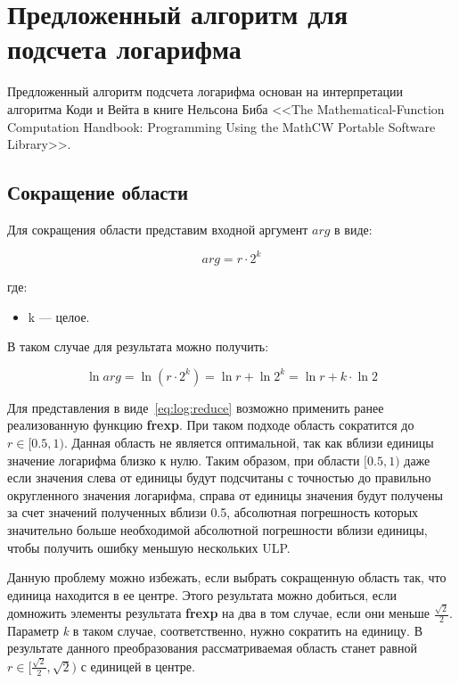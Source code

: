 \chapter{Предложенный алгоритм для подсчета логарифма}

Предложенный алгоритм подсчета логарифма основан на интерпретации алгоритма Коди и Вейта в книге Нельсона Биба <<The Mathematical-Function Computation Handbook: Programming Using the MathCW Portable Software Library>>\cite{beebe}.

\section{Сокращение области}

Для сокращения области представим входной аргумент $arg$ в виде:

\begin{equation}
    arg = r \cdot 2^k
    \label{eq:log:reduce}
\end{equation}

где:

\begin{itemize}
    \item[] k --- целое.
\end{itemize}

В таком случае для результата можно получить:

\begin{equation}
    \ln{arg} = \ln{(r \cdot 2^k)} = \ln{r} + \ln{2^k} = \ln{r} + k \cdot \ln{2}
    \label{eq:log:reconstr}
\end{equation}

Для представления в виде~\ref{eq:log:reduce} возможно применить ранее реализованную функцию \textbf{frexp}.
При таком подходе область сократится до $r \in [0.5, 1)$.
Данная область не является оптимальной, так как вблизи единицы значение логарифма близко к нулю.
Таким образом, при области $[0.5, 1)$ даже если значения слева от единицы будут подсчитаны с точностью до правильно округленного значения логарифма, справа от единицы значения будут получены за счет значений полученных вблизи 0.5, абсолютная погрешность которых значительно больше необходимой абсолютной погрешности вблизи единицы, чтобы получить ошибку меньшую нескольких ULP.

Данную проблему можно избежать, если выбрать сокращенную область так, что единица находится в ее центре.
Этого результата можно добиться, если домножить элементы результата \textbf{frexp} на два в том случае, если они меньше $\frac{\sqrt{2}}{2}$.
Параметр \textit{k} в таком случае, соответственно, нужно сократить на единицу.
В результате данного преобразования рассматриваемая область станет равной $r \in [\frac{\sqrt{2}}{2}, \sqrt{2})$ с единицей в центре.

